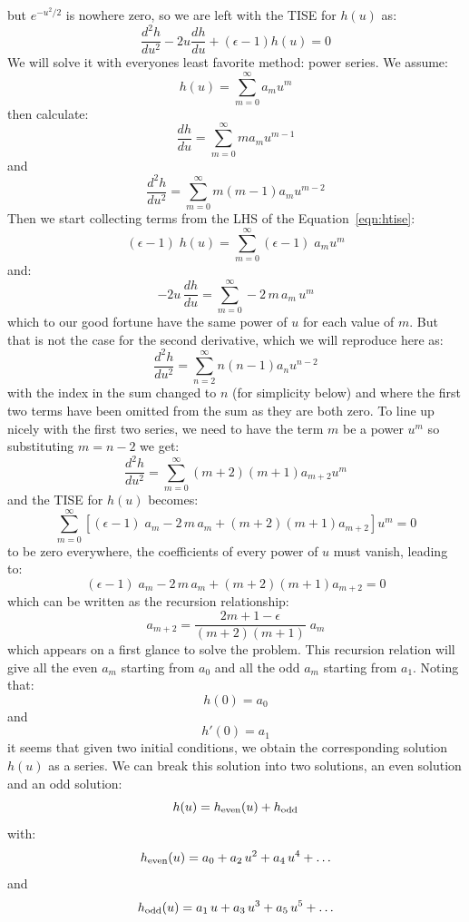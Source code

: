 \documentclass[12pt]{book}
\begin{document}
but $e^{-u^2/2}$ is nowhere zero, so we are left with the TISE for $h(u)$ as:
\begin{equation}
\label{eqn:htise}
\frac{d^2h}{du^2} - 2 u \frac{dh}{du} + (\epsilon-1)h(u) = 0
\end{equation}
We will solve it with everyones least favorite method: power series.  We assume:
$$h(u) = \sum_{m=0}^{\infty} a_m u^m$$
then calculate:
$$\frac{dh}{du} = \sum_{m=0}^{\infty} m a_m u^{m-1}$$
and
$$\frac{d^2h}{du^2} = \sum_{m=0}^{\infty} m (m-1) a_m u^{m-2}$$
Then we start collecting terms from the LHS of the Equation~\ref{eqn:htise}:
$$(\epsilon-1)\;h(u) = \sum_{m=0}^{\infty} (\epsilon-1)\;a_m u^m$$
and:
$$-2 u \, \frac{dh}{du} = \sum_{m=0}^{\infty} -2 \, m \, a_m \, u^{m}$$
which to our good fortune have the same power of $u$ for each value of $m$.  But that is not the case for the second derivative, which we will reproduce here as:
$$\frac{d^2h}{du^2} = \sum_{n=2}^{\infty} n (n-1) a_n u^{n-2}$$
with the index in the sum changed to $n$ (for simplicity below) and where the first two terms have been omitted from the sum as they are both zero.  To line up nicely with the first two series, we need to have the term $m$ be a power $u^m$ so substituting $m = n - 2$ we get:
$$\frac{d^2h}{du^2} = \sum_{m=0}^{\infty} (m+2) (m+1) a_{m+2} u^{m}$$
and the TISE for $h(u)$ becomes:
$$\sum_{m=0}^{\infty} \left[(\epsilon-1)\;a_m -2 \, m \, a_m + (m+2) (m+1) a_{m+2} \right] u^{m} = 0$$
to be zero everywhere, the coefficients of every power of $u$ must vanish, leading to:
$$(\epsilon-1)\;a_m -2 \, m \, a_m + (m+2) (m+1) a_{m+2} = 0$$
which can be written as the recursion relationship:
$$a_{m+2} = \frac{2m+1-\epsilon}{(m+2)(m+1)} \; a_m$$
which appears on a first glance to solve the problem.  This recursion relation will give all the even $a_m$ starting from $a_0$ and all the odd $a_m$ starting from $a_1$. Noting that:
$$h(0) = a_0$$
and 
$$h'(0) = a_1$$
it seems that given two initial conditions, we obtain the corresponding solution $h(u)$ as a series.  
We can break this solution into two solutions, an even solution and an odd solution:
$$h(u) = h_{\rm even}(u) + h_{\rm odd}$$
with:
$$h_{\rm even}(u) = a_0 + a_2 \, u^2 + a_4 \, u^4 + \ldots$$
and 
$$h_{\rm odd}(u) = a_1 \, u + a_3 \, u^3 + a_5 \, u^5 + \ldots$$
\end{document}

